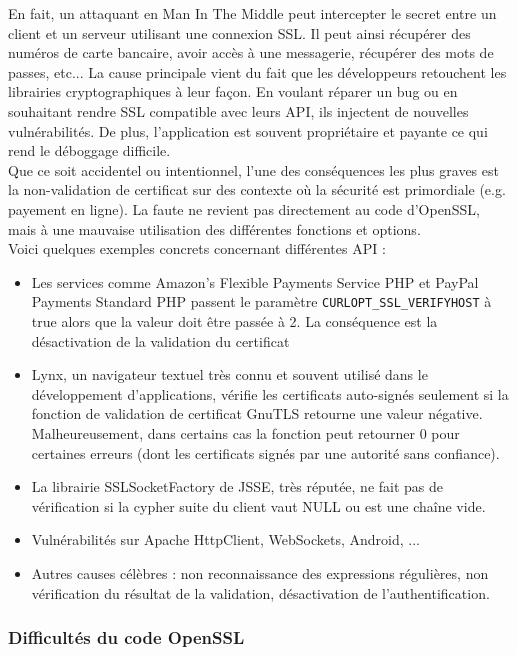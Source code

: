 En fait, un attaquant en Man In The Middle peut intercepter le secret entre un client et un serveur utilisant une connexion SSL. Il peut ainsi récupérer des numéros de carte bancaire, avoir accès à une messagerie, récupérer des mots de passes, etc... La cause principale vient du fait que les développeurs retouchent les librairies cryptographiques à leur façon. En voulant réparer un bug ou en souhaitant rendre SSL compatible avec leurs API, ils injectent de nouvelles vulnérabilités. De plus, l'application est souvent propriétaire et payante ce qui rend le déboggage difficile.\\


Que ce soit accidentel ou intentionnel, l'une des conséquences les plus graves est la non-validation de certificat sur des contexte où la sécurité est primordiale (e.g. payement en ligne). La faute ne revient pas directement au code d'OpenSSL, mais à une mauvaise utilisation des différentes fonctions et options.\\


Voici quelques exemples concrets concernant différentes API :
\begin{itemize}
\item Les services comme Amazon's Flexible Payments Service PHP et PayPal Payments Standard PHP passent le paramètre \texttt{CURLOPT\_SSL\_VERIFYHOST} à true alors que la valeur doit être passée à 2. La conséquence est la désactivation de la validation du certificat
\item Lynx, un navigateur textuel très connu et souvent utilisé dans le développement d'applications, vérifie les certificats auto-signés seulement si la fonction de validation de certificat GnuTLS retourne une valeur négative. Malheureusement, dans certains cas la fonction peut retourner 0 pour certaines erreurs (dont les certificats signés par une autorité sans confiance).
\item La librairie SSLSocketFactory de JSSE, très réputée, ne fait pas de vérification si la cypher suite du client vaut NULL ou est une chaîne vide.
\item Vulnérabilités sur Apache HttpClient, WebSockets, Android, ...
\item Autres causes célèbres : non reconnaissance des expressions régulières, non vérification du résultat de la validation, désactivation de l'authentification.\\
\end{itemize}


\subsubsection{Difficultés du code OpenSSL}


